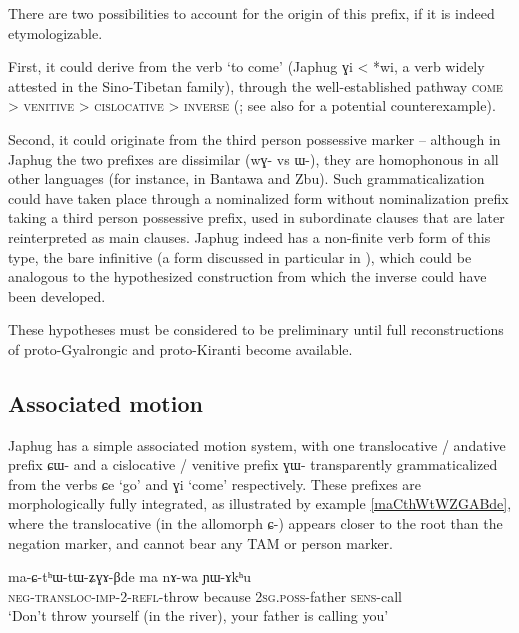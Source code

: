 \documentclass[oldfontcommands,oneside,a4paper,11pt]{article}
\newcommand{\ipa}[1]{\mbox{\phon #1}} %
\begin{document}
There are two possibilities to account for the origin of this prefix, if it is indeed etymologizable. 

First, it could derive from the verb `to come' (Japhug \ipa{ɣi} < *\ipa{wi}, a verb widely attested in the Sino-Tibetan family), through the well-established pathway \textsc{come} > \textsc{venitive} > \textsc{cislocative} > \textsc{inverse} (\citealt{jacques14inverse}; see also \citealt{konnerth15cisloc} for a potential counterexample).

Second, it could originate from the third person possessive marker -- although in Japhug the two prefixes are dissimilar (\ipa{wɣ-} vs \ipa{ɯ-}), they are homophonous in all other languages (for instance, in Bantawa and Zbu). Such grammaticalization could have taken place through a nominalized form without nominalization prefix taking a third person possessive prefix, used in subordinate clauses that are later reinterpreted as main clauses.  Japhug indeed has a non-finite verb form of this type, the bare infinitive (a form discussed in particular in \citealt{jacques14antipassive}), which could be analogous to the hypothesized construction from which the inverse could have been developed.

These hypotheses must be considered to be preliminary until full reconstructions of proto-Gyalrongic and proto-Kiranti become available.

\subsection{Associated motion}
Japhug has a simple associated motion system, with one translocative / andative prefix \ipa{ɕɯ-} and a cislocative / venitive prefix \ipa{ɣɯ-} transparently grammaticalized from the verbs \ipa{ɕe} `go' and \ipa{ɣi} `come' respectively. These prefixes are morphologically fully integrated, as illustrated by example \ref{maCthWtWZGABde}, where the translocative (in the allomorph \ipa{ɕ-}) appears closer to the root than the negation marker, and cannot bear any TAM or person marker.

\begin{exe}
\ex \label{maCthWtWZGABde}
\gll \ipa{ma-ɕ-tʰɯ-tɯ-ʑɣɤ-βde} 	\ipa{ma} 	\ipa{nɤ-wa} 	\ipa{ɲɯ-ɤkʰu}   \\
\textsc{neg-transloc-imp-2-refl}-throw because \textsc{2sg.poss}-father \textsc{sens}-call \\
\glt `Don't throw yourself (in the river), your father is calling you' 
\end{exe}
\end{document}

